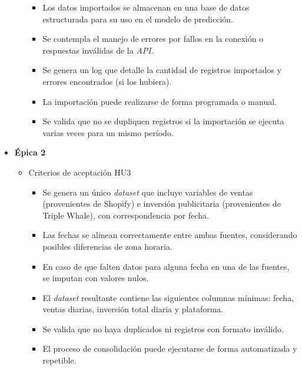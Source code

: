 \documentclass[
11pt, %
]{charter}
\begin{document}
\begin{itemize}
\begin{itemize}
\begin{itemize}
      \item Los datos importados se almacenan en una base de datos estructurada para su uso en el modelo de predicción.

      \item Se contempla el manejo de errores por fallos en la conexión o respuestas inválidas de la \textit{API}.

      \item Se genera un log que detalle la cantidad de registros importados y errores encontrados (si los hubiera).

      \item La importación puede realizarse de forma programada o manual.

      \item Se valida que no se dupliquen registros si la importación se ejecuta varias veces para un mismo período.      
      \end{itemize}
      
    \end{itemize}
  \item \textbf{\'{E}pica 2}
    \begin{itemize}
    
      \item Criterios de aceptación HU3

    \begin{itemize}
    		\item Se genera un único \textit{dataset} que incluye variables de ventas (provenientes de Shopify) e inversión publicitaria (provenientes de Triple Whale), con correspondencia por fecha.

		\item Las fechas se alinean correctamente entre ambas fuentes, considerando posibles diferencias de zona horaria.

		\item En caso de que falten datos para alguna fecha en una de las fuentes, se imputan con valores nulos.

		\item El \textit{dataset} resultante contiene las siguientes columnas mínimas: fecha, ventas diarias, inversión total diaria y plataforma.

		\item Se valida que no haya duplicados ni registros con formato inválido.

		\item El proceso de consolidación puede ejecutarse de forma automatizada y repetible.


\end{itemize}
\end{itemize}
\end{itemize}
\end{document}
